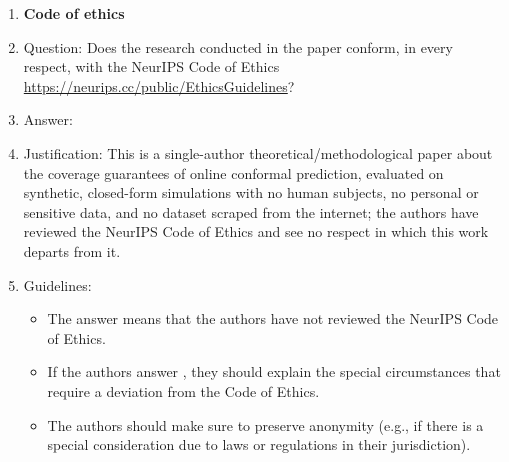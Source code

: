 \begin{enumerate}
\item {\bf Code of ethics}
    \item[] Question: Does the research conducted in the paper conform, in every respect, with the NeurIPS Code of Ethics \url{https://neurips.cc/public/EthicsGuidelines}?
    \item[] Answer: \answerYes{}
    \item[] Justification: This is a single-author theoretical/methodological paper about the coverage guarantees of online conformal prediction, evaluated on synthetic, closed-form simulations with no human subjects, no personal or sensitive data, and no dataset scraped from the internet; the authors have reviewed the NeurIPS Code of Ethics and see no respect in which this work departs from it.
    \item[] Guidelines:
    \begin{itemize}
        \item The answer \answerNA{} means that the authors have not reviewed the NeurIPS Code of Ethics.
        \item If the authors answer \answerNo, they should explain the special circumstances that require a deviation from the Code of Ethics.
        \item The authors should make sure to preserve anonymity (e.g., if there is a special consideration due to laws or regulations in their jurisdiction).
    \end{itemize}



\end{enumerate}
